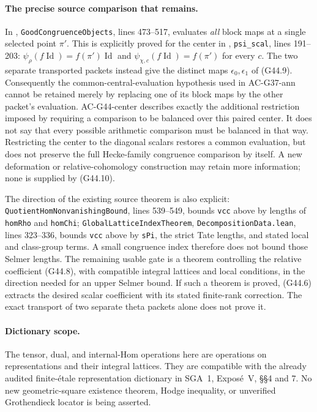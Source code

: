 \paragraph{The precise source comparison that remains.}
In ,
\texttt{GoodCongruenceObjects}, lines 473--517, evaluates
\emph{all} block maps at a single selected point $\pi'$.
This is explicitly proved for the center in
,
\texttt{psi\_scal}, lines 191--203:
$\psi_\rho(f\operatorname{Id})=f(\pi')\operatorname{Id}$ and
$\psi_{\chi,c}(f\operatorname{Id})=f(\pi')$ for every $c$.
The two separate transported packets instead give the distinct
maps $\epsilon_0,\epsilon_1$ of (G44.9).
Consequently the common-central-evaluation hypothesis used in
AC-G37-ann cannot be retained merely by replacing one of its
block maps by the other packet's evaluation.
AC-G44-center describes exactly the additional restriction
imposed by requiring a comparison to be balanced over this
paired center.  It does not say that every possible arithmetic
comparison must be balanced in that way.  Restricting the center
to the diagonal scalars restores a common evaluation, but does
not preserve the full Hecke-family congruence comparison by itself.
A new deformation or relative-cohomology construction may retain
more information; none is supplied by (G44.10).

The direction of the existing source theorem is also explicit:
\texttt{QuotientHom}\allowbreak\texttt{NonvanishingBound},
lines 539--549, bounds
\texttt{vcc} above by lengths of \texttt{homRho} and
\texttt{homChi}; \texttt{GlobalLattice}\allowbreak\texttt{IndexTheorem},
\texttt{DecompositionData.lean}, lines 323--336, bounds
\texttt{vcc} above by \texttt{sPi}, the strict Tate lengths,
and stated local and class-group terms.  A small congruence
index therefore does not bound those Selmer lengths.
The remaining usable gate is a theorem controlling the relative
coefficient (G44.8), with compatible integral lattices and local
conditions, in the direction needed for an upper Selmer bound.
If such a theorem is proved, (G44.6) extracts the desired scalar
coefficient with its stated finite-rank correction.  The exact
transport of two separate theta packets alone does not prove it.

\paragraph{Dictionary scope.}
The tensor, dual, and internal-Hom operations here are operations
on representations and their integral lattices.  They are
compatible with the already audited finite-\'etale representation
dictionary in SGA~1, Expos\'e~V, \S\S4 and 7.
No new geometric-square existence theorem, Hodge inequality,
or unverified Grothendieck locator is being asserted.
